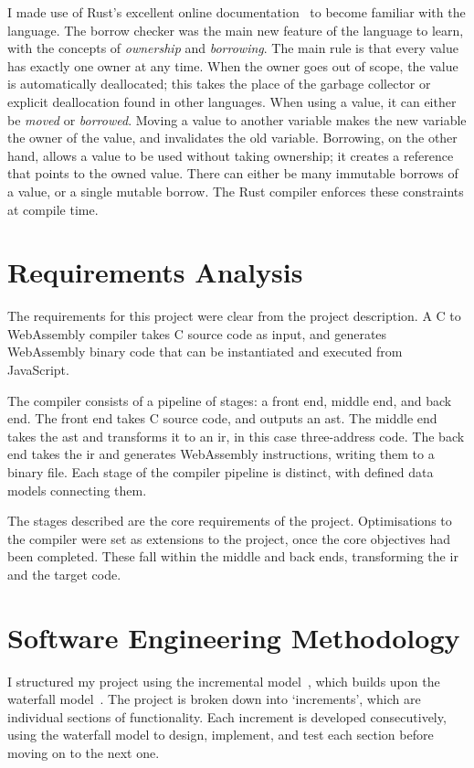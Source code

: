 \documentclass[00-main.tex]{subfiles}
\begin{document}
I made use of Rust's excellent online documentation~ to become familiar with the language.
The borrow checker was the main new feature of the language to learn, with the concepts of \emph{ownership} and \emph{borrowing}.
The main rule is that every value has exactly one owner at any time.
When the owner goes out of scope, the value is automatically deallocated; this takes the place of the garbage collector or explicit deallocation found in other languages.
When using a value, it can either be \emph{moved} or \emph{borrowed}.
Moving a value to another variable makes the new variable the owner of the value, and invalidates the old variable.
Borrowing, on the other hand, allows a value to be used without taking ownership; it creates a reference that points to the owned value.
There can either be many immutable borrows of a value, or a single mutable borrow.
The Rust compiler enforces these constraints at compile time.

\section{Requirements Analysis}

The requirements for this project were clear from the project description.
A C to WebAssembly compiler takes C source code as input, and generates WebAssembly binary code that can be instantiated and executed from JavaScript.

The compiler consists of a pipeline of stages: a front end, middle end, and back end.
The front end takes C source code, and outputs an \gls{ast}.
The middle end takes the \gls{ast} and transforms it to an \gls{ir}, in this case three-address code.
The back end takes the \gls{ir} and generates WebAssembly instructions, writing them to a binary file.
Each stage of the compiler pipeline is distinct, with defined data models connecting them.

The stages described are the core requirements of the project.
Optimisations to the compiler were set as extensions to the project, once the core objectives had been completed.
These fall within the middle and back ends, transforming the \gls{ir} and the target code.



\section{Software Engineering Methodology}

I structured my project using the incremental model~, which builds upon the waterfall model~.
The project is broken down into `increments', which are individual sections of functionality.
Each increment is developed consecutively, using the waterfall model to design, implement, and test each section before moving on to the next one.
\end{document}
